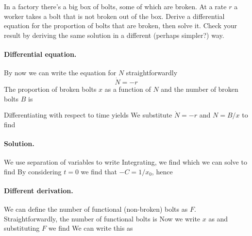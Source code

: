 In a factory there's a big box of bolts, some of which are broken. At a rate $r$ a worker takes a bolt that is not broken out of the box. Derive a differential equation for the proportion of bolts that are broken, then solve it. Check your result by deriving the same solution in a different (perhaps simpler?) way.



\solution
\paragraph{Differential equation.} By now we can write the equation for $N$ straightforwardly 
\begin{equation}
 \dot{N}=-r
\end{equation}
The proportion of broken bolts $x$ as a function of $N$ and the number of broken bolts $B$ is 

Differentiating with respect to time yields
We substitute $\dot{N}=-r$ and $N=B/x$ to find 


\paragraph{Solution.}
We use separation of variables to write 
Integrating, we find
which we can solve to find 
By considering $t=0$ we find that $-C=1/x_0$, hence

\paragraph{Different derivation.}

We can define the number of  functional (non-broken) bolts as $F$. Straightforwardly, the number of functional bolts is 
Now we write $x$ as 
and substituting $F$ we find 
We can write this as 
